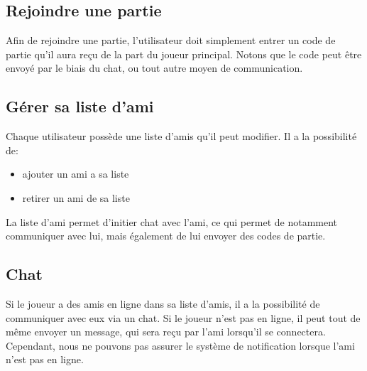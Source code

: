 \documentclass[../besoin_user.tex]{subfiles}
\begin{document}
\subsection{Rejoindre une partie}
Afin de rejoindre une partie, l'utilisateur doit simplement entrer un code de partie qu'il aura reçu de la part du joueur principal.
Notons que le code peut être envoyé par le biais du chat, ou tout autre moyen de communication.

\subsection{Gérer sa liste d'ami}
Chaque utilisateur possède une liste d'amis qu'il peut modifier. Il a la possibilité de:
\begin{itemize}
    \item ajouter un ami a sa liste
    \item retirer un ami de sa liste
\end{itemize}
La liste d'ami permet d'initier chat avec l'ami, ce qui permet de notamment communiquer avec lui, mais également de lui envoyer des codes de partie.

\subsection{Chat}
Si le joueur a des amis en ligne dans sa liste d'amis, il a la possibilité de communiquer avec eux via un chat. 
Si le joueur n'est pas en ligne, il peut tout de même envoyer un message, qui sera reçu par l'ami lorsqu'il se connectera.
Cependant, nous ne pouvons pas assurer le système de notification lorsque l'ami n'est pas en ligne.
\end{document}
